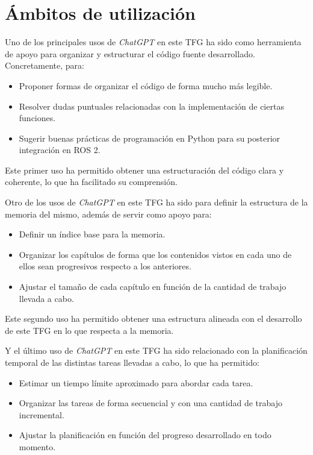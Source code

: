 \section{Ámbitos de utilización}
\label{sec:segundaseccion}

Uno de los principales usos de \textit{ChatGPT} en este TFG ha sido como herramienta de apoyo para organizar y estructurar el código fuente desarrollado. Concretamente, para:

\begin{itemize}
\item Proponer formas de organizar el código de forma mucho más legible.
\item Resolver dudas puntuales relacionadas con la implementación de ciertas funciones.
\item Sugerir buenas prácticas de programación en Python para su posterior integración en ROS 2.
\end{itemize}

Este primer uso ha permitido obtener una estructuración del código clara y coherente, lo que ha facilitado su comprensión.

\vspace{0.25cm}

Otro de los usos de \textit{ChatGPT} en este TFG ha sido para definir la estructura de la memoria del mismo, además de servir como apoyo para:

\begin{itemize}
\item Definir un índice base para la memoria.
\item Organizar los capítulos de forma que los contenidos vistos en cada uno de ellos sean progresivos respecto a los anteriores.
\item Ajustar el tamaño de cada capítulo en función de la cantidad de trabajo llevada a cabo.
\end{itemize}

Este segundo uso ha permitido obtener una estructura alineada con el desarrollo de este TFG en lo que respecta a la memoria.

\vspace{0.25cm}

Y el último uso de \textit{ChatGPT} en este TFG ha sido relacionado con la planificación temporal de las distintas tareas llevadas a cabo, lo que ha permitido:

\newpage

\begin{itemize}
\item Estimar un tiempo límite aproximado para abordar cada tarea.
\item Organizar las tareas de forma secuencial y con una cantidad de trabajo incremental.
\item Ajustar la planificación en función del progreso desarrollado en todo momento.
\end{itemize}

